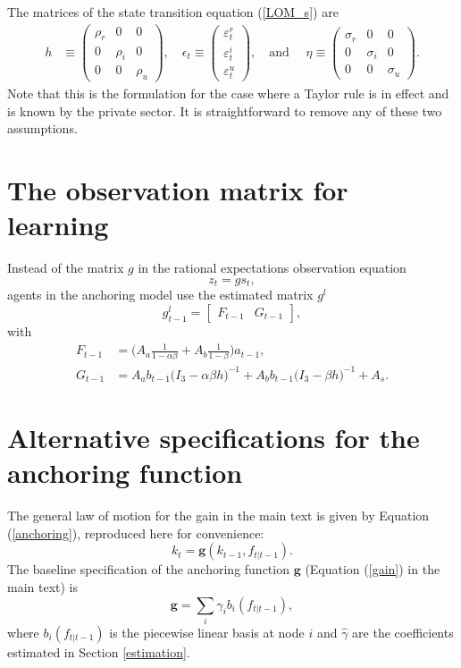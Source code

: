 \documentclass[11pt]{article}
\renewcommand{\[}{\begin{equation}}
\renewcommand{\]}{\end{equation}}
\begin{document}
The matrices of the state transition equation (\ref{LOM_s}) are
 \begin{align}
 h  & \equiv \begin{pmatrix} \rho_r & 0 & 0 \\ 0& \rho_i & 0 \\ 0&0& \rho_u 
 \end{pmatrix},  \quad 
 \epsilon_t \equiv \begin{pmatrix}\varepsilon_t^{r} \\ \varepsilon_t^{i}  \\ \varepsilon_t^{u} 
 \end{pmatrix},  \quad  \text{and } \quad \eta  \equiv \begin{pmatrix} \sigma_r & 0 & 0 \\ 0& \sigma_i & 0 \\ 0&0& \sigma_u 
 \end{pmatrix}. 
 \end{align}
Note that this is the formulation for the case where a Taylor rule is in effect and is known by the private sector. It is straightforward to remove any of these two assumptions.



\section{The observation matrix for learning}\label{app_FG}
Instead of the matrix $g$ in the rational expectations observation equation
\begin{equation}
z_t = g s_t \label{RE_obs},
\end{equation}
agents in the anchoring model use the estimated matrix $g^l$
\begin{equation}
g_{t-1}^l = \begin{bmatrix} F_{t-1} & G_{t-1} \end{bmatrix},
\end{equation}
with
\begin{align}
F_{t-1} & = \bigg(A_a \frac{1}{1-\alpha\beta} + A_b\frac{1}{1-\beta} \bigg)a_{t-1},\\
G_{t-1} & = A_a b_{t-1}\bigg(I_3 - \alpha\beta h \bigg)^{-1} + A_b b_{t-1}\bigg(I_3 - \beta h \bigg)^{-1} + A_s.
\end{align}

\section{Alternative specifications for the anchoring function}\label{alternative_criteria}
The general law of motion for the gain in the main text is given by Equation (\ref{anchoring}), reproduced here for convenience:
\begin{equation}
k_t  = \mathbf{g}(k_{t-1},f_{t|t-1}). 
\end{equation}
The baseline specification of the anchoring function $\mathbf{g}$ (Equation (\ref{gain}) in the main text) is \begin{equation}
\mathbf{g} = \sum_i \gamma_i b_i(f_{t|t-1}),
\end{equation}
where $ b_i(f_{t|t-1})$ is the piecewise linear basis at node $i$ and $\hat{\gamma}$ are the coefficients estimated in Section \ref{estimation}.
\end{document}
